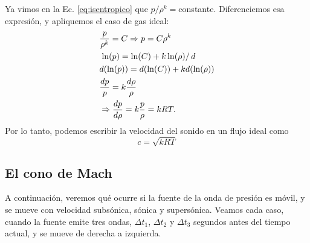 Ya vimos en la Ec. \eqref{eq:isentropico} que $p/\rho^k=$constante.
Diferenciemos esa expresión, y apliquemos el caso de gas ideal:
%
\begin{align}
&\frac{p}{\rho^k}=C\Rightarrow p = C\rho^k\nonumber\\
&\left.\ln(p) = \ln(C)+k\ln(\rho)\right/d\nonumber\\
&d(\ln(p)) =d(\ln(C)) + kd(\ln(\rho))\nonumber\\
&\frac{dp}{p} = k\frac{d\rho}{\rho}\nonumber\\
&\Rightarrow \frac{dp}{d\rho} = k\frac{p}{\rho} = kRT.
\end{align}
%
Por lo tanto, podemos escribir la velocidad del sonido en un flujo ideal como 
%
\begin{equation}
c=\sqrt{kRT}
\end{equation}

\subsection*{El cono de Mach}

A continuación, veremos qué ocurre si la fuente de la onda de presión es móvil, y se mueve con velocidad subsónica, sónica y supersónica.
Veamos cada caso, cuando la fuente emite tres ondas, $\Delta t_1$, $\Delta t_2$ y $\Delta t_3$ segundos antes del tiempo actual, y se mueve de derecha a izquierda.  

